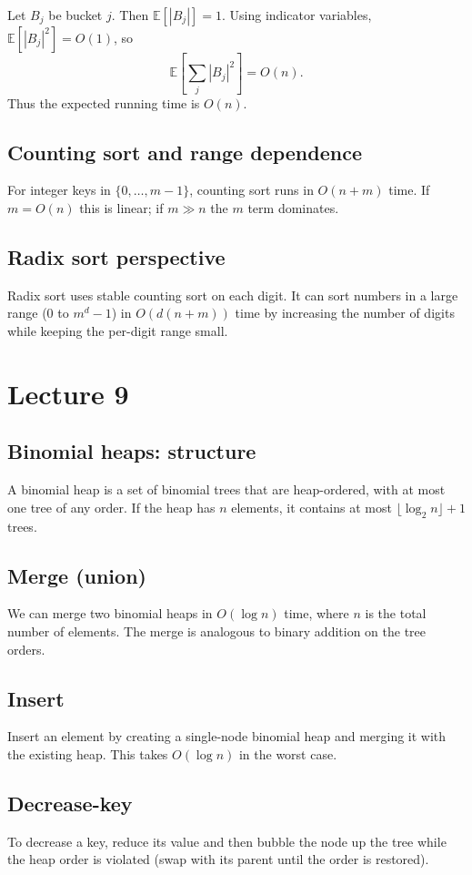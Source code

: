 \documentclass[11pt]{article}
\begin{document}
{{{{Let $B_j$ be bucket $j$. Then $\mathbb{E}[|B_j|]=1$. Using indicator variables,
\(\mathbb{E}[|B_j|^2] = O(1)\), so
\[
\mathbb{E}\left[\sum_j |B_j|^2\right] = O(n).
\]
Thus the expected running time is $O(n)$.

\subsection*{Counting sort and range dependence}
For integer keys in $\{0,\ldots,m-1\}$, counting sort runs in $O(n+m)$ time. If $m=O(n)$ this is
linear; if $m \gg n$ the $m$ term dominates.

\subsection*{Radix sort perspective}
Radix sort uses stable counting sort on each digit. It can sort numbers in a large range
($0$ to $m^d-1$) in $O(d(n+m))$ time by increasing the number of digits while keeping the per-digit
range small.

\section{Lecture 9}

\subsection*{Binomial heaps: structure}
A binomial heap is a set of binomial trees that are heap-ordered, with at most one tree of any
order. If the heap has $n$ elements, it contains at most $\lfloor \log_2 n \rfloor + 1$ trees.

\subsection*{Merge (union)}
We can merge two binomial heaps in $O(\log n)$ time, where $n$ is the total number of elements.
The merge is analogous to binary addition on the tree orders.

\subsection*{Insert}
Insert an element by creating a single-node binomial heap and merging it with the existing heap.
This takes $O(\log n)$ in the worst case.

\subsection*{Decrease-key}
To decrease a key, reduce its value and then bubble the node up the tree while the heap order is
violated (swap with its parent until the order is restored).

}}}}
\end{document}
